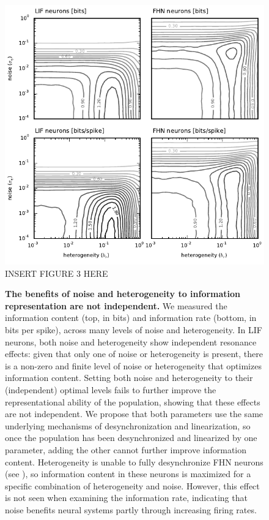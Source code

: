 \documentclass[12pt]{article}
\begin{document}
\begin{figure}
  \ifx\hidefigures\undefined
    \centering
    \includegraphics[width=\textwidth]{figure3_infocontour.pdf}
  \else
    INSERT FIGURE 3 HERE
  \fi
  \caption{
    \textbf{The benefits of noise and heterogeneity to information representation are not independent.}
We measured the information content (top, in bits) and information rate (bottom, in bits per spike),
across many levels of noise and heterogeneity.
In LIF neurons, both noise and heterogeneity show independent resonance effects:
given that only one of noise or heterogeneity is present,
there is a non-zero and finite level of noise or heterogeneity that optimizes information content.
Setting both noise and heterogeneity to their (independent) optimal levels
fails to further improve the representational ability of the population,
showing that these effects are not independent.
We propose that both parameters use
the same underlying mechanisms of desynchronization and linearization,
so once the population has been desynchronized and linearized by one parameter,
adding the other cannot further improve information content.
Heterogeneity is unable to fully desynchronize FHN neurons (see \textsc{}),
so information content in these neurons is maximized for a specific combination of heterogeneity and noise. However, this effect is not seen when examining the information rate,
indicating that noise benefits neural systems partly through increasing firing rates.
  }
  \label{fig:infocontour}
\end{figure}
\end{document}
